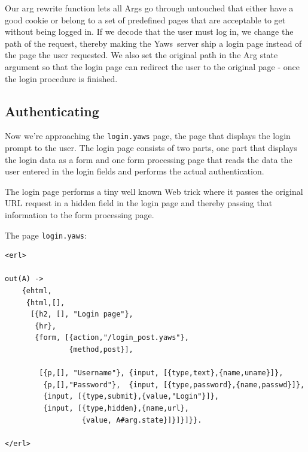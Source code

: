 \documentclass[11pt,oneside,english]{book}
\newcommand{\Yaws}            %
        {{\sc Yaws}}
\begin{document}
Our arg rewrite function lets all Args go through untouched
that either have a good cookie or belong to a set of predefined
pages that are acceptable to get without being logged in.
If we decode that the user must log in,
 we change the path of the request,
 thereby making the \Yaws\  server ship a login page instead of the page the
user requested. We also set the original path in the Arg state argument so
that the login page can redirect the user to the original page - once the login procedure is finished.



  \subsection{Authenticating}


Now we're approaching the \verb+login.yaws+ page, the page that displays
the login prompt to the user. The login page consists of two parts,
one part that displays the login data as a form and one form processing page
that reads the data the user entered in the login fields and performs
the actual authentication.

The login page performs a tiny well known Web trick where it
passes the original URL request in a hidden field in the login page and thereby passing that information to the form processing page.

The page \verb+login.yaws+:

\begin{verbatim}
<erl>

out(A) ->
    {ehtml,
     {html,[],
      [{h2, [], "Login page"},
       {hr},
       {form, [{action,"/login_post.yaws"},
               {method,post}],

        [{p,[], "Username"}, {input, [{type,text},{name,uname}]},
         {p,[],"Password"},  {input, [{type,password},{name,passwd}]},
         {input, [{type,submit},{value,"Login"}]},
         {input, [{type,hidden},{name,url},
                  {value, A#arg.state}]}]}]}}.

</erl>
\end{verbatim}
\end{document}

